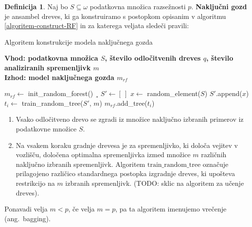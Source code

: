\documentclass[12pt,a4paper,twoside]{article}
\theoremstyle{definition} %
\newtheorem{definicija}{Definicija}[section]
\theoremstyle{plain} %
\numberwithin{equation}{section}  %
\begin{document}
\begin{definicija}
Naj bo $S \subseteq \omega$ podatkovna množica razsežnosti $p$.
\textbf{Naključni gozd} je ansambel dreves, ki ga konstruiramo s postopkom opisanim v algoritmu \ref{algoritem-construct-RF} in za katerega veljata sledeči pravili:
%
\begin{algorithm}[ht]
	\caption{Algoritem konstrukcije modela naključnega gozda}
	\label{algoritem-construct-RF}
	\raggedright
	\textbf{Vhod: podatkovna množica $S$, število odločitvenih dreves $q$, število analiziranih spremenljivk $m$}  \\
	\textbf{Izhod: model naključnega gozda $m_{rf}$} 
	\begin{algorithmic}[0]
	  \State $m_{rf} \gets $ init\_random\_forest()
  ¸	\State $S' \gets [\ ]$
		  \State $x \gets$ random\_element($S$)
		  \State $S'$.append($x$)
	  \EndFor
	  \State $t_i \gets $ train\_random\_tree($S'$, $m$)
	  \State $m_{rf}$.add\_tree($t_i$)
	  \EndFor
	\end{algorithmic}
\end{algorithm}
%
\begin{enumerate}
\item Vsako odločitveno drevo se zgradi iz množice naključno izbranih primerov iz podatkovne množice $S$.

\item Na vsakem koraku gradnje drevesa je za spremenljivko, ki določa vejitev v vozlišču, določena optimalna spremenljivka izmed množice $m$ različnih naključno izbranih spremenljivk. 
Algoritem $\mathrm{train\_random\_tree}$ označuje prilagojeno različico standardnega postopka izgradnje dreves, ki upošteva restrikcijo na $m$ izbranih spremenljivk. (TODO: sklic na algoritem za učenje dreves). 
\end{enumerate}
%
Ponavadi velja $m < p$, če velja $m=p$, pa ta algoritem imenujemo vrečenje (ang.~bagging).
\end{definicija}


\end{document}

